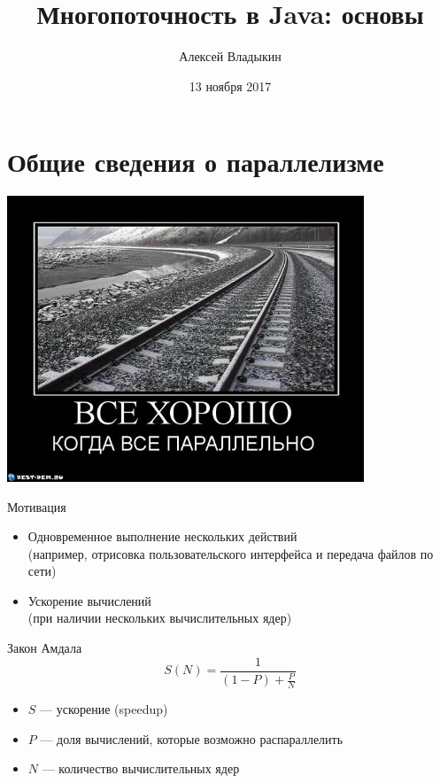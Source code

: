\documentclass[unicode,mathserif]{beamer}
\title[Многопоточность (1)]{Многопоточность в Java: основы}
\author{Алексей Владыкин}
\date{13 ноября 2017}
\begin{document}
\begin{frame}
\titlepage
\end{frame}

\begin{frame}
\tableofcontents
\end{frame}


\section{Общие сведения о параллелизме}

\begin{frame}
\centering
\includegraphics[width=0.8\textwidth]{pics/parallel.jpg}
\end{frame}


\begin{frame}{Мотивация}
\begin{itemize}
\item Одновременное выполнение нескольких действий\\
    (например, отрисовка пользовательского интерфейса
    и передача файлов по сети)
    \bigskip

\item Ускорение вычислений\\
    (при наличии нескольких вычислительных ядер)
\end{itemize}
\end{frame}


\begin{frame}{Закон Амдала}
$$S(N)=\frac{1}{(1-P)+\frac{P}{N}}$$
\bigskip
\begin{itemize}
\item $S$ --- ускорение (speedup)
\item $P$ --- доля вычислений, которые возможно распараллелить
\item $N$ --- количество вычислительных ядер
\end{itemize}
\end{frame}
\end{document}
